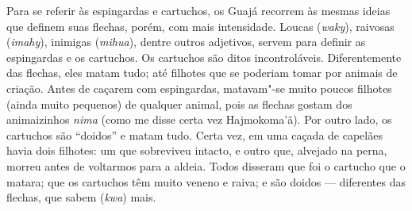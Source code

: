 Para se referir às espingardas e cartuchos, os Guajá recorrem às mesmas
ideias que definem suas flechas, porém, com mais intensidade. Loucas
(\emph{waky}), raivosas (\emph{imahy}), inimigas (\emph{mihua}), dentre
outros adjetivos, servem para definir as espingardas e os cartuchos. Os
cartuchos são ditos incontroláveis. Diferentemente das flechas, eles
matam tudo; até filhotes que se poderiam tomar por animais de criação.
Antes de caçarem com espingardas, matavam"-se muito poucos filhotes
(ainda muito pequenos) de qualquer animal, pois as flechas gostam dos
animaizinhos \emph{nima} (como me disse certa vez Hajmokoma'ã). Por
outro lado, os cartuchos são ``doidos'' e matam tudo. Certa vez, em uma
caçada de capelães havia dois filhotes: um que sobreviveu intacto, e
outro que, alvejado na perna, morreu antes de voltarmos para a aldeia.
Todos disseram que foi o cartucho que o matara; que os cartuchos têm
muito veneno e raiva; e são doidos --- diferentes das flechas, que sabem
(\emph{kwa}) mais.

